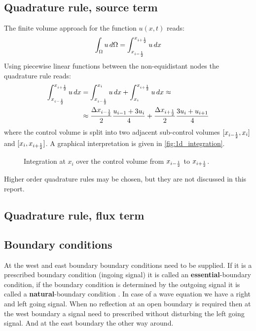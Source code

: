 \subsection{Quadrature rule, source term}\label{sec:source_quadrature_rule}
The finite volume approach for the function $u(x,t)$ reads:
\begin{align}
    \int_\Omega u \, d\Omega = \int_{x_{i-\frac{1}{2}}}^{x_{i+\frac{1}{2}}} u \, dx
\end{align}
Using piecewise linear functions between the non-equidistant nodes the quadrature rule reads:
\begin{align}
    \int_{x_{i-\frac{1}{2}}}^{x_{i+\frac{1}{2}}} u \, dx & = \int_{x_{i-\frac{1}{2}}}^{x_i} u \, dx + \int_{x_i}^{x_{i+\frac{1}{2}}} u \, dx \approx
    \\
    & \approx \frac{\Delta x_{i-\frac{1}{2}}}{2} \frac{u_{i-1} + 3 u_{i}}{4} + \frac{\Delta x_{i+\frac{1}{2}}}{2} \frac{3 u_{i} + u_{i+1}}{4}
\end{align}
where the control volume is split into two adjacent sub-control volumes  $[x_{i-\frac{1}{2}}, x_i]$ and $[x_i, x_{i+\frac{1}{2}}]$.
A graphical interpretation is given in \autoref{fig:1d_integration}.
\begin{figure}[H]
    \begin{center}
        \resizebox{0.8\textwidth}{!}{
            
        }
    \end{center}
    \caption{Integration at $x_i$ over the control volume from $x_{i-\frac{1}{2}}$ to $x_{i+\frac{1}{2}}$.}\label{fig:1d_integration}
\end{figure}
Higher order quadrature rules may be chosen, but they are not discussed in this report.
\subsection{Quadrature rule, flux term}\label{sec:flux_quadrature_rule}

\subsection{Boundary conditions}\label{sec:boundary_conditions}
At the west and east boundary boundary conditions need to be supplied.
If it is a prescribed boundary condition (ingoing signal) it is called an \textbf{essential}-boundary condition, if the boundary condition is determined by the outgoing signal it is called a \textbf{natural}-boundary condition \citep{Logan1987,VanKanEtAL2008}.
In case of a wave equation we have a right and left going signal.
When no reflection at an open boundary is required then at the west boundary a signal need to prescribed  without disturbing the left going signal.
And at the east boundary the other way around.

